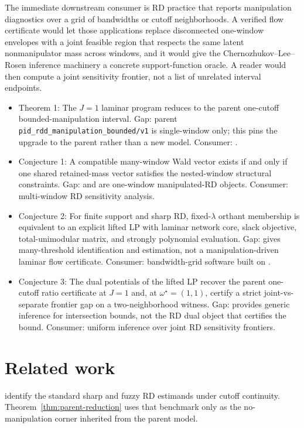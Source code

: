 \documentclass[11pt]{article}
\theoremstyle{definition}
\theoremstyle{plain}
\theoremstyle{remark}
\begin{document}
The immediate downstream consumer is RD practice that reports manipulation diagnostics over a
grid of bandwidths or cutoff neighborhoods.  A verified flow certificate would let those
applications replace disconnected one-window envelopes with a joint feasible region that
respects the same latent nonmanipulator mass across windows, and it would give the
Chernozhukov--Lee--Rosen inference machinery a concrete support-function oracle.  A reader would
then compute a joint sensitivity frontier, not a list of unrelated interval endpoints.

\begin{itemize}[leftmargin=*]
  \item Theorem 1: The \(J=1\) laminar program reduces to the parent one-cutoff bounded-manipulation interval. Gap: parent \texttt{pid\_rdd\_manipulation\_bounded/v1} is single-window only; this pins the upgrade to the parent rather than a new model. Consumer: \citet{gerard_rokkanen_rothe_2020_rdbounds}.
  \item Conjecture 1: A compatible many-window Wald vector exists if and only if one shared retained-mass vector satisfies the nested-window structural constraints. Gap: \citet[Abstract]{gerard_rokkanen_rothe_2020_rdbounds} and \citet[Abstract]{rosenman_rajkumar_gauriot_slonim_2019_discrete_manipulation} are one-window manipulated-RD objects. Consumer: multi-window RD sensitivity analysis.
  \item Conjecture 2: For finite support and sharp RD, fixed-\(\lambda\) orthant membership is equivalent to an explicit lifted LP with laminar network core, slack objective, total-unimodular matrix, and strongly polynomial evaluation. Gap: \citet[Abstract; pp.~216--217]{bertanha_2020_many_thresholds} gives many-threshold identification and estimation, not a manipulation-driven laminar flow certificate. Consumer: bandwidth-grid software built on \citet{cattaneo_jansson_ma_2020_density}.
  \item Conjecture 3: The dual potentials of the lifted LP recover the parent one-cutoff ratio certificate at \(J=1\) and, at \(\omega^\star=(1,1)\), certify a strict joint-vs-separate frontier gap on a two-neighborhood witness. Gap: \citet[Abstract; p.~667]{chernozhukov_lee_rosen_2013_intersection_bounds} provides generic inference for intersection bounds, not the RD dual object that certifies the bound. Consumer: uniform inference over joint RD sensitivity frontiers.
\end{itemize}

\section{Related work}
\citet{hahn_todd_van_der_klaauw_2001} identify the standard sharp and fuzzy RD estimands under
cutoff continuity.  Theorem~\ref{thm:parent-reduction} uses that benchmark only as the
no-manipulation corner inherited from the parent model.
\end{document}
